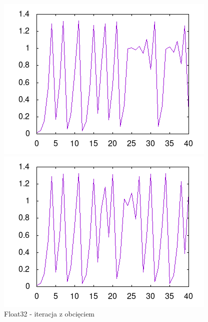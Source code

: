 \documentclass[11pt, a4paper]{article}
\begin{document}
\begin{figure}[h]
\begin{minipage}{0.48\textwidth}
    \includegraphics[width=\linewidth]{32}
  \end{minipage}
  \begin{minipage}{0.48\textwidth}
    \centering
    \caption{Float32 - iteracja z obcięciem}
    \includegraphics[width=\linewidth]{cut32}
  \end{minipage}
\end{figure}
\end{document}
